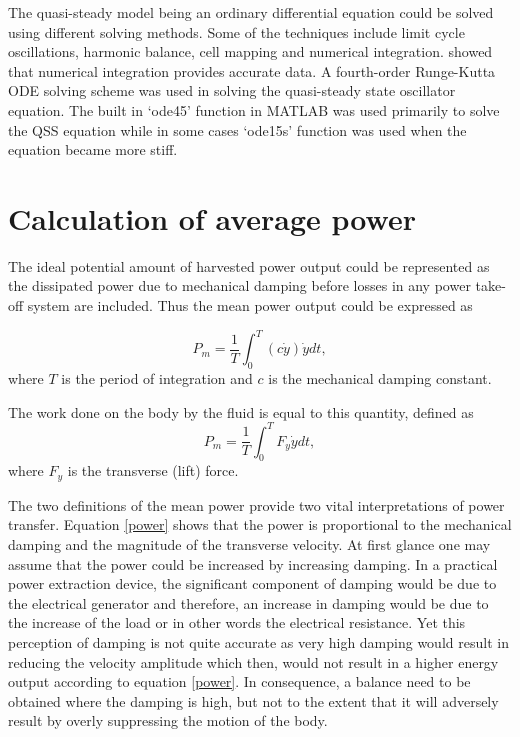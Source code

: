 The quasi-steady model being an ordinary differential equation could be solved using different solving methods. Some of the techniques include limit cycle oscillations, harmonic balance, cell mapping and numerical integration. \citet{Vio2007} showed that numerical integration provides accurate data. A fourth-order Runge-Kutta ODE solving scheme was used in solving the quasi-steady state oscillator equation. The built in `ode45' function in MATLAB was used primarily to solve the QSS equation while in some cases `ode15s' function was used when the equation became more stiff.


\section{Calculation of average power}

The ideal potential amount of harvested power output could be represented as the dissipated power due to mechanical damping before losses in any power take-off system are included. Thus the mean power output could be expressed as 


\begin{equation}
\label{eqn:power}
P_{m}=\frac{1}{T}\int_{0}^{T}(c\dot{y})\dot{y} dt,
\end{equation}
where $T$ is the period of integration and $c$ is the mechanical damping constant. 

The work done on the body by the fluid is equal to this quantity, defined as
\begin{equation}
\label{eqn:power_alt}
P_{m}=\frac{1}{T}\int_{0}^{T}F_y\dot{y} dt,
\end{equation}
where $F_y$ is the transverse (lift) force.

The two definitions of the mean power provide two vital interpretations of power transfer. Equation \ref{power} shows that the power is proportional to the mechanical damping and the magnitude of the transverse velocity. At first glance one may assume that the power could be increased by increasing damping. In a practical power extraction device, the significant component of damping would be due to the electrical generator and therefore, an increase in damping would be due to the increase of the load or in other words the electrical resistance. Yet this perception of damping is not quite accurate as very high damping would result in reducing the velocity amplitude which then, would not result in a higher energy output according to equation \ref{power}. In consequence, a balance need to be obtained where the damping is high, but not to the extent that it will adversely result by overly suppressing the motion of the body.  

